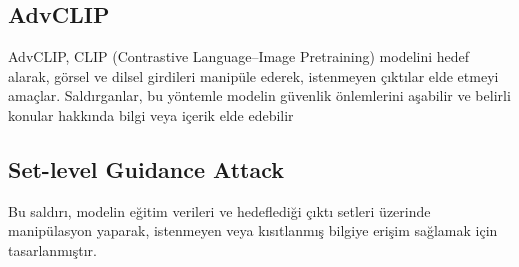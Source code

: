 \newpage

\subsection{AdvCLIP}

AdvCLIP, CLIP (Contrastive Language–Image Pretraining) modelini hedef alarak, görsel ve dilsel girdileri manipüle ederek, istenmeyen çıktılar elde etmeyi amaçlar. Saldırganlar, bu yöntemle modelin güvenlik önlemlerini aşabilir ve belirli konular hakkında bilgi veya içerik elde edebilir

\newpage

\subsection{Set-level Guidance Attack}

Bu saldırı, modelin eğitim verileri ve hedeflediği çıktı setleri üzerinde manipülasyon yaparak, istenmeyen veya kısıtlanmış bilgiye erişim sağlamak için tasarlanmıştır.

\newpage